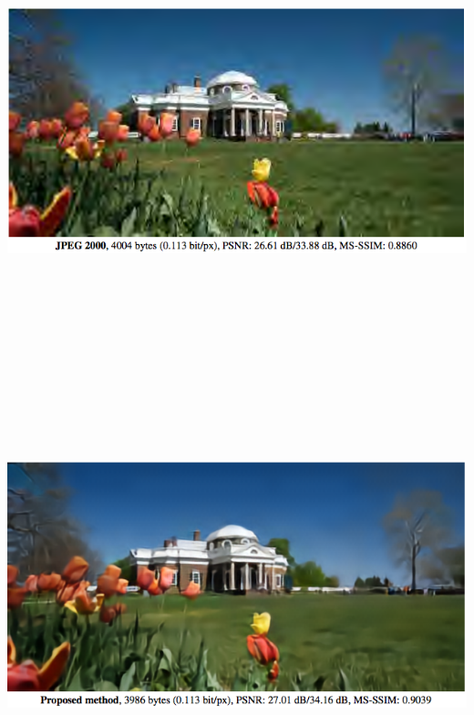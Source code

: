 {\bigskip
\centerline{\includegraphics[height= 5in]{../images/RateDist3}}


\bigskip
\centerline{\includegraphics[height = 5in]{../images/RateDist4}}

}
